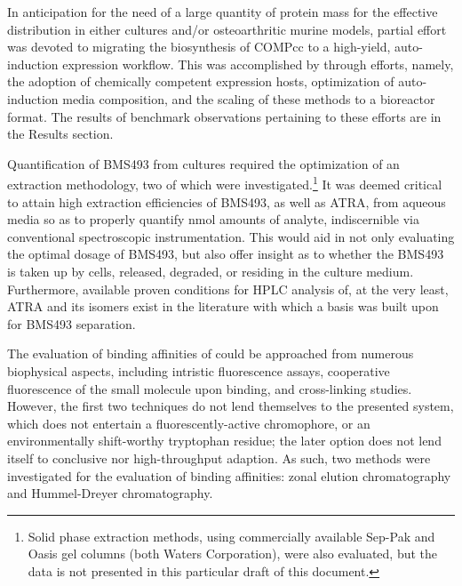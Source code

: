 \begin{refsection}
\begin{description}
\end{description}
In anticipation for the need of a large quantity of protein mass for the
effective distribution in either  cultures and/or 
osteoarthritic murine models, partial effort was devoted to migrating the
biosynthesis of COMPcc to a high-yield, auto-induction expression workflow. This
was accomplished by through efforts, namely, the adoption of 
chemically competent expression hosts, optimization of auto-induction media
composition, and the scaling of these methods to a bioreactor format. The
results of benchmark observations pertaining to these efforts are in the Results
section.

Quantification of BMS493 from cultures required the optimization of an
extraction methodology, two of which were investigated.\footnote{Solid phase
    extraction methods, using commercially available Sep-Pak  and Oasis
    gel columns (both Waters Corporation), were also evaluated, but the data is
not presented in this particular draft of this document.} It was deemed critical
to attain high extraction efficiencies of BMS493, as well as ATRA, from aqueous
media so as to properly quantify \si{\nano\mol} amounts of analyte,
indiscernible via conventional spectroscopic instrumentation. This would aid in
not only evaluating the optimal dosage of BMS493, but also offer insight as to
whether the BMS493 is taken up by cells, released, degraded, or residing in the
culture medium. Furthermore, available proven conditions for HPLC analysis of, at
the very least, ATRA and its isomers exist in the literature with which a basis
was built upon for BMS493
separation.\cite{Kim2010b,Chauveau-Duriot2010,Schaffer2010a,Kane2008b,DeLeenheer1982,Motto1989} 

The evaluation of binding affinities of could be approached from numerous
biophysical aspects, including intristic fluorescence assays, cooperative
fluorescence of the small molecule upon binding, and cross-linking studies.
However, the first two techniques do not lend themselves to the presented
system, which does not entertain a fluorescently-active chromophore, or an
environmentally shift-worthy tryptophan residue; the later option does not lend
itself to conclusive nor high-throughput adaption. As such, two methods were
investigated for the evaluation of binding affinities: zonal elution
chromatography and Hummel-Dreyer chromatography.


\end{refsection}
